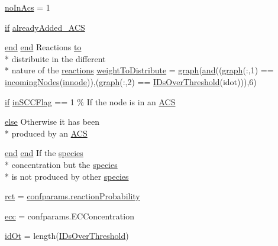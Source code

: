 \begin{DoxyCompactItemize}
\item 
\hyperlink{a00028_ac45b9c97670e4b4e103ce174dc2db6b3}{no\+In\+Acs} = 1
\item 
\hyperlink{a00030_a01d55766b8058903dd360b4bda71f9f5}{if} \hyperlink{a00028_a77c2cda04a3103708011753a77dceda3}{already\+Added\+\_\+\+A\+C\+S}
\item 
\hyperlink{a00025_afb358f48b1646c750fb9da6c6585be2b}{end} \hyperlink{a00025_afb358f48b1646c750fb9da6c6585be2b}{end} Reactions \hyperlink{a00028_af71dbe52628a3f83a77ab494817525c6}{to} \\*
distribuite in the different \\*
nature of the \hyperlink{a00020}{reactions} \hyperlink{a00028_a8f29aae1a516e7b27fa97f490490b59c}{weight\+To\+Distribute} = \hyperlink{a00028_a2745e24fec2a44d51f4452beb1596bd3}{graph}(\hyperlink{a00028_a170f8acb213f91bf71c77b1d20bceb33}{and}((\hyperlink{a00028_a2745e24fec2a44d51f4452beb1596bd3}{graph}(\+:,1) == \hyperlink{a00028_a34c98e3306059653f2a214e5ef975e9c}{incoming\+Nodes}(\hyperlink{a00028_a21f06040cb68a910280e04d4c59d980e}{innode})),(\hyperlink{a00028_a2745e24fec2a44d51f4452beb1596bd3}{graph}(\+:,2) == \hyperlink{a00028_a67c695f856b6731644c6a128e602a323}{I\+Ds\+Over\+Threshold}(idot))),6)
\item 
\hyperlink{a00030_a01d55766b8058903dd360b4bda71f9f5}{if} \hyperlink{a00028_af1605fa33751cda7e0c840d6df8f8a59}{in\+S\+C\+C\+Flag} == 1 \% If the node is in an \hyperlink{a00028_ad72e1068795c577213481e5db7f3e925}{A\+C\+S}
\item 
\hyperlink{a00031_af5946383720aa572eb93e1e63afc23c2}{else} Otherwise it has been \\*
produced by an \hyperlink{a00028_ad72e1068795c577213481e5db7f3e925}{A\+C\+S}
\item 
\hyperlink{a00025_afb358f48b1646c750fb9da6c6585be2b}{end} \hyperlink{a00025_afb358f48b1646c750fb9da6c6585be2b}{end} If the \hyperlink{a00021}{species} \\*
concentration but the \hyperlink{a00021}{species} \\*
is not produced by other \hyperlink{a00028_ad7a297e3111ffc45eba4a3b88590cb30}{species}
\item 
\hyperlink{a00028_a188d6e4d5a19aaeb1532fc5b9791afba}{rct} = \hyperlink{a00113_a9101beaeb03fddb5c6a9e68442177543}{confparams.\+reaction\+Probability}
\item 
\hyperlink{a00028_a4c229c44edda979d1be7b28b83e5e8b9}{ecc} = confparams.\+E\+C\+Concentration
\item 
\hyperlink{a00028_ad5352b3d09cda91b8c5f90532900abeb}{id\+Ot} = length(\hyperlink{a00028_a67c695f856b6731644c6a128e602a323}{I\+Ds\+Over\+Threshold})

\end{DoxyCompactItemize}
